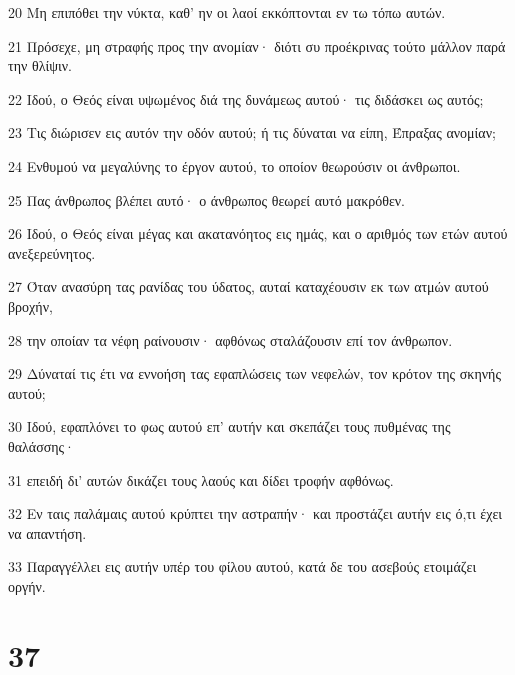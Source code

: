 \par 20 Μη επιπόθει την νύκτα, καθ' ην οι λαοί εκκόπτονται εν τω τόπω αυτών.
\par 21 Πρόσεχε, μη στραφής προς την ανομίαν· διότι συ προέκρινας τούτο μάλλον παρά την θλίψιν.
\par 22 Ιδού, ο Θεός είναι υψωμένος διά της δυνάμεως αυτού· τις διδάσκει ως αυτός;
\par 23 Τις διώρισεν εις αυτόν την οδόν αυτού; ή τις δύναται να είπη, Έπραξας ανομίαν;
\par 24 Ενθυμού να μεγαλύνης το έργον αυτού, το οποίον θεωρούσιν οι άνθρωποι.
\par 25 Πας άνθρωπος βλέπει αυτό· ο άνθρωπος θεωρεί αυτό μακρόθεν.
\par 26 Ιδού, ο Θεός είναι μέγας και ακατανόητος εις ημάς, και ο αριθμός των ετών αυτού ανεξερεύνητος.
\par 27 Όταν ανασύρη τας ρανίδας του ύδατος, αυταί καταχέουσιν εκ των ατμών αυτού βροχήν,
\par 28 την οποίαν τα νέφη ραίνουσιν· αφθόνως σταλάζουσιν επί τον άνθρωπον.
\par 29 Δύναταί τις έτι να εννοήση τας εφαπλώσεις των νεφελών, τον κρότον της σκηνής αυτού;
\par 30 Ιδού, εφαπλόνει το φως αυτού επ' αυτήν και σκεπάζει τους πυθμένας της θαλάσσης·
\par 31 επειδή δι' αυτών δικάζει τους λαούς και δίδει τροφήν αφθόνως.
\par 32 Εν ταις παλάμαις αυτού κρύπτει την αστραπήν· και προστάζει αυτήν εις ό,τι έχει να απαντήση.
\par 33 Παραγγέλλει εις αυτήν υπέρ του φίλου αυτού, κατά δε του ασεβούς ετοιμάζει οργήν.

\chapter{37}

